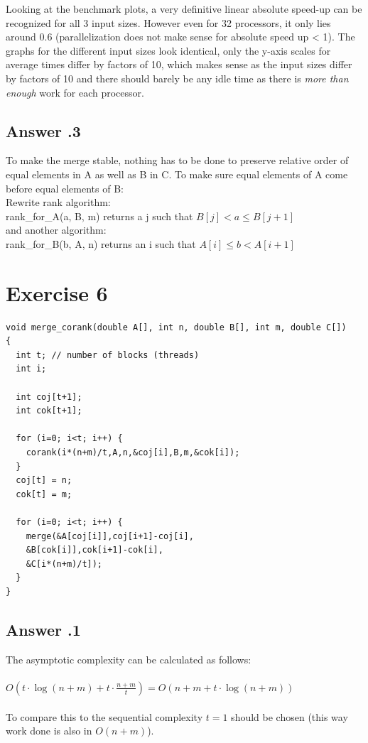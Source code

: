 \documentclass[a4paper,%
11pt,%
DIV=12,
headsepline,%
headings=normal,
]{scrartcl}
\newcounter{curex}
\newcommand{\exercise}[1]{\section*{Exercise #1}\setcounter{curex}{#1}}
\newcommand{\answer}[1]{\subsection*{Answer \arabic{curex}.#1}}
\begin{document}
\noindent
Looking at the benchmark plots, a very definitive linear absolute speed-up can be recognized for all 3 input sizes. However even for 32 processors, it only lies around 0.6 (parallelization does not make sense for absolute speed up < 1). The graphs for the different input sizes look identical, only the y-axis scales for average times differ by factors of 10, which makes sense as the input sizes differ by factors of 10 and there should barely be any idle time as there is \textit{more than enough} work for each processor.

\answer{3}
To make the merge stable, nothing has to be done to preserve relative order of equal elements in A as well as B in C.
To make sure equal elements of A come before equal elements of B: \\
Rewrite rank algorithm:\\
rank{\_}for{\_}A(a, B, m) returns a j such that $B[j] < a \leq B[j + 1]$ \\
and another algorithm: \\
rank{\_}for{\_}B(b, A, n) returns an i such that $A[i] \leq b < A[i + 1]$

\newpage
\exercise{6}
\begin{minipage}[t]{1.0\linewidth}
\begin{lstlisting}
void merge_corank(double A[], int n, double B[], int m, double C[])
{
  int t; // number of blocks (threads)
  int i;
  
  int coj[t+1];
  int cok[t+1];
  
  for (i=0; i<t; i++) {
    corank(i*(n+m)/t,A,n,&coj[i],B,m,&cok[i]);
  }
  coj[t] = n;
  cok[t] = m;
  
  for (i=0; i<t; i++) {
    merge(&A[coj[i]],coj[i+1]-coj[i],
    &B[cok[i]],cok[i+1]-cok[i],
    &C[i*(n+m)/t]);
  }
}
\end{lstlisting}
\end{minipage}

\answer{1}
The asymptotic complexity can be calculated as follows:\\
\\
$O\left(t \cdot \log(n+m) + t \cdot \frac{n+m}{t} \right) = O(n + m + t \cdot \log(n+m))$
\\
\\
To compare this to the sequential complexity $t=1$ should be chosen (this way work done is also in $O(n+m)$).
\end{document}
